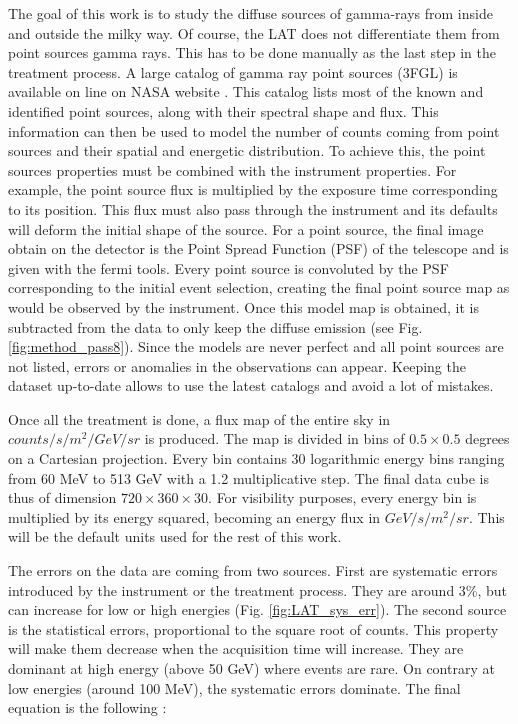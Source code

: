 The goal of this work is to study the diffuse sources of gamma-rays from inside and outside the milky way. Of course, the LAT does not differentiate them from point sources gamma rays. This has to be done manually as the last step in the treatment process. A large catalog of gamma ray point sources (3FGL) is available on line on NASA website . This catalog lists most of the known and identified point sources, along with their spectral shape and flux. This information can then be used to model the number of counts coming from point sources and their spatial and energetic distribution. To achieve this, the point sources properties must be combined with the instrument  properties. For example, the point source flux is multiplied by the exposure time corresponding to its position. This flux must also pass through the instrument and its defaults will deform the initial shape of the source. For a point source, the final image obtain on the detector is the Point Spread Function (PSF) of the telescope and is given with the fermi tools. Every point source is convoluted by the PSF corresponding to the initial event selection, creating the final point source map as would be observed by the instrument.
Once this model map is obtained, it is subtracted from the data to only keep the diffuse emission (see Fig. \ref{fig:method_pass8}). Since the models are never perfect and all point sources are not listed, errors or anomalies in the observations can appear. Keeping the dataset up-to-date allows to use the latest catalogs and avoid a lot of mistakes.


Once all the treatment is done, a flux map of the entire sky in $counts/s/m^2/GeV/sr$ is produced. The map is divided in bins of $0.5 \times 0.5$ degrees on a Cartesian projection. Every bin contains 30 logarithmic energy bins ranging from 60 MeV to 513 GeV with a 1.2 multiplicative step. The final data cube is thus of dimension $720 \times 360 \times 30$. For visibility purposes, every energy bin is multiplied by its energy squared, becoming an energy flux in $GeV/s/m^2/sr$. This will be the default units used for the rest of this work.

The errors on the data are coming from two sources. First are systematic errors introduced by the instrument or the treatment process. They are around 3\%, but can increase for low or high energies (Fig. \ref{fig:LAT_sys_err}). The second source is the statistical errors, proportional to the square root of counts. This property will make them decrease when the acquisition time will increase. They are dominant at high energy (above 50 GeV) where events are rare. On contrary at low energies (around 100 MeV), the systematic errors dominate. The final equation is the following :

